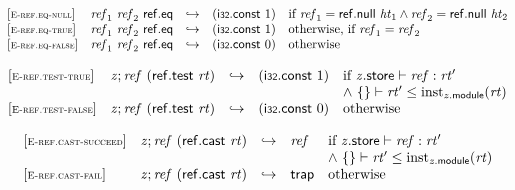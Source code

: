 $$
\begin{array}{@{}l@{}lcl@{}l@{}}
{[\textsc{\scriptsize E{-}ref.eq{-}null}]} \quad & {\mathit{ref}}_{{1}}~{\mathit{ref}}_{{2}}~\mathsf{ref.eq} &\hookrightarrow& (\mathsf{i{\scriptstyle32}}.\mathsf{const}~1) &\quad
  \mbox{if}~{\mathit{ref}}_{{1}} = \mathsf{ref.null}~{\mathit{ht}}_{{1}} \land {\mathit{ref}}_{{2}} = \mathsf{ref.null}~{\mathit{ht}}_{{2}} \\
{[\textsc{\scriptsize E{-}ref.eq{-}true}]} \quad & {\mathit{ref}}_{{1}}~{\mathit{ref}}_{{2}}~\mathsf{ref.eq} &\hookrightarrow& (\mathsf{i{\scriptstyle32}}.\mathsf{const}~1) &\quad
  \mbox{otherwise, if}~{\mathit{ref}}_{{1}} = {\mathit{ref}}_{{2}} \\
{[\textsc{\scriptsize E{-}ref.eq{-}false}]} \quad & {\mathit{ref}}_{{1}}~{\mathit{ref}}_{{2}}~\mathsf{ref.eq} &\hookrightarrow& (\mathsf{i{\scriptstyle32}}.\mathsf{const}~0) &\quad
  \mbox{otherwise} \\
\end{array}
$$

\vspace{1ex}

$$
\begin{array}{@{}l@{}lcl@{}l@{}}
{[\textsc{\scriptsize E{-}ref.test{-}true}]} \quad & {\mathit{z}} ; {\mathit{ref}}~(\mathsf{ref.test}~{\mathit{rt}}) &\hookrightarrow& (\mathsf{i{\scriptstyle32}}.\mathsf{const}~1) &\quad
  \mbox{if}~{\mathit{z}}.\mathsf{store} \vdash {\mathit{ref}} : {\mathit{rt}'} \\
 &&&&\quad {\land}~\{ \begin{array}[t]{@{}l@{}}
 \}\end{array} \vdash {\mathit{rt}'} \leq {{\mathrm{inst}}}_{{\mathit{z}}.\mathsf{module}}({\mathit{rt}}) \\
{[\textsc{\scriptsize E{-}ref.test{-}false}]} \quad & {\mathit{z}} ; {\mathit{ref}}~(\mathsf{ref.test}~{\mathit{rt}}) &\hookrightarrow& (\mathsf{i{\scriptstyle32}}.\mathsf{const}~0) &\quad
  \mbox{otherwise} \\
\end{array}
$$

\vspace{1ex}

$$
\begin{array}{@{}l@{}lcl@{}l@{}}
{[\textsc{\scriptsize E{-}ref.cast{-}succeed}]} \quad & {\mathit{z}} ; {\mathit{ref}}~(\mathsf{ref.cast}~{\mathit{rt}}) &\hookrightarrow& {\mathit{ref}} &\quad
  \mbox{if}~{\mathit{z}}.\mathsf{store} \vdash {\mathit{ref}} : {\mathit{rt}'} \\
 &&&&\quad {\land}~\{ \begin{array}[t]{@{}l@{}}
 \}\end{array} \vdash {\mathit{rt}'} \leq {{\mathrm{inst}}}_{{\mathit{z}}.\mathsf{module}}({\mathit{rt}}) \\
{[\textsc{\scriptsize E{-}ref.cast{-}fail}]} \quad & {\mathit{z}} ; {\mathit{ref}}~(\mathsf{ref.cast}~{\mathit{rt}}) &\hookrightarrow& \mathsf{trap} &\quad
  \mbox{otherwise} \\
\end{array}
$$

